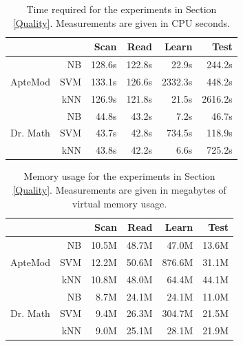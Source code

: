 \begin{table}
\begin{center}
\begin{tabular}{|c|r|r r r r|}
\cline{3-6}
\multicolumn{2}{c|}{}
                 &  Scan  &  Read   &  Learn  &  Test   \\ \hline
           & NB  & 128.6s & 122.8s  &   22.9s &  244.2s \\
ApteMod    & SVM & 133.1s & 126.6s  & 2332.3s &  448.2s \\
           & kNN & 126.9s & 121.8s  &   21.5s & 2616.2s \\ \hline
           & NB  &  44.8s &  43.2s  &    7.2s &   46.7s \\
Dr. Math   & SVM &  43.7s &  42.8s  &  734.5s &  118.9s \\
           & kNN &  43.8s &  42.2s  &    6.6s &  725.2s \\ \hline
\end{tabular}
\end{center}
\caption[Time required for the experiments in Section \ref{Quality}]
 {Time required for the experiments in Section \ref{Quality}.
  Measurements are given in CPU seconds.}
\label{eval-time}
\end{table}

\begin{table}
\begin{center}
\begin{tabular}{|c|r|r r r r|}
\cline{3-6}
\multicolumn{2}{c|}{}
                 &  Scan &  Read  & Learn  & Test  \\ \hline
           & NB  & 10.5M & 48.7M  & 47.0M  & 13.6M \\
ApteMod    & SVM & 12.2M & 50.6M  & 876.6M & 31.1M \\
           & kNN & 10.8M & 48.0M  & 64.4M  & 44.1M \\ \hline
           & NB  & 8.7M  & 24.1M  & 24.1M  & 11.0M \\
Dr. Math   & SVM & 9.4M  & 26.3M  & 304.7M & 21.5M \\
           & kNN & 9.0M  & 25.1M  & 28.1M  & 21.9M \\ \hline
\end{tabular}
\end{center}
\caption[Memory usage for the experiments in Section \ref{Quality}]
 {Memory usage for the experiments in Section \ref{Quality}.
  Measurements are given in megabytes of virtual memory usage.}
\label{eval-memory}
\end{table}

